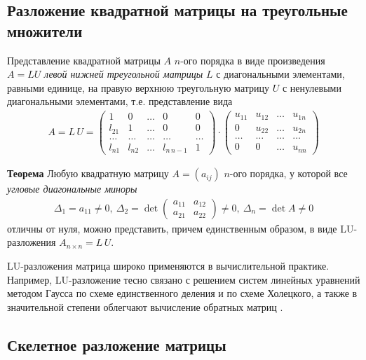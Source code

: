 \documentclass[%
	11pt,
	a4paper,
	utf8,
		]{article}
\begin{document}
\subsection{Разложение квадратной матрицы на треугольные множители}

Представление квадратной матрицы $ A $ $ n $-ого порядка в виде произведения $ A = L U $ \emph{левой нижней треугольной матрицы} $ L $ с диагональными элементами, равными единице, на правую верхнюю треугольную матрицу $ U $ с ненулевыми диагональными элементами, т.е. представление вида
\begin{align*}
	A = L \, U = \begin{pmatrix}
		1 & 0 & \ldots & 0 & 0 \\
		l_{21} & 1 & \ldots & 0 & 0 \\
		\ldots & \ldots & \ldots & \ldots & \ldots \\
		l_{n1} & l_{n2} & \ldots & l_{n \, n-1} & 1
	\end{pmatrix} \cdot 
    \begin{pmatrix}
    	u_{11} & u_{12} & \ldots & u_{1n} \\
    	0 & u_{22} & \ldots & u_{2n} \\
    	\ldots & \ldots & \ldots & \ldots \\
    	0 & 0 & \ldots & u_{nn}
    \end{pmatrix}
\end{align*}

\textbf{Теорема} Любую квадратную матрицу $ A = (a_{ij}) $ $ n $-ого порядка, у которой все \emph{угловые диагональные миноры}
\begin{align*}
	\Delta_1 = a_{11} \neq 0, \ \Delta_2 = \det \begin{pmatrix}
		a_{11} & a_{12} \\
		a_{21} & a_{22}
	\end{pmatrix} \neq 0, \ \Delta_n = \det A \neq 0
\end{align*}
отличны от нуля, можно представить, причем единственным образом, в виде LU-разложения $ A_{n \times n} = L \, U $.

LU-разложения матрица широко применяются в вычислительной практике. Например, LU-разложение тесно связано с решением систем линейных уравнений методом Гаусса по схеме единственного деления и по схеме Холецкого, а также в значительной степени облегчают вычисление обратных матриц \cite[]{shevtsov:linal-2012}.

\subsection{Скелетное разложение матрицы}
\end{document}
